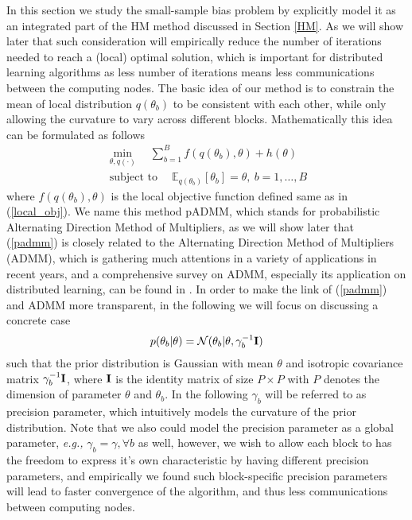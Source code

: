 \documentclass{article}
\DeclareMathOperator*{\st}{subject~to}
\newcommand{\eg}[0]{\emph{e.g., }}
\newcommand{\Imat}[0]{\ensuremath{{\bf I}}\xspace}
\newcommand{\1}[0]{\ensuremath{\boldsymbol{1}}\xspace}
\begin{document}
In this section we study the small-sample bias problem by explicitly model it as an integrated part of the HM method discussed in Section \ref{HM}. As we will show later that such consideration will empirically reduce the number of iterations needed to reach a (local) optimal solution, which is important for distributed learning algorithms as less number of iterations means less communications between the computing nodes. The basic idea of our method is to constrain the mean of local distribution $q(\theta_b)$ to be consistent with each other, while only allowing the curvature to vary across different blocks. Mathematically this idea can be formulated as follows 
\begin{equation}\label{padmm}
\begin{gathered}
\min_{\theta, q(\cdot)} \quad\textstyle\sum_{b=1}^B f(q(\theta_b), \theta) + h(\theta)\\
\st \quad \mathbb{E}_{q(\theta_b)}[\theta_b] = \theta, ~ b = 1, \ldots, B
\end{gathered}
\end{equation}
where $f(q(\theta_b), \theta)$ is the local objective function defined same as in (\ref{local_obj}). We name this method pADMM, which stands for probabilistic Alternating Direction Method of Multipliers, as we will show later that (\ref{padmm}) is closely related to the Alternating Direction Method of Multipliers (ADMM), which is gathering much attentions in a variety of applications in recent years, and a comprehensive survey on ADMM, especially its application on distributed learning, can be found in \cite{Boyd10}. In order to make the link of (\ref{padmm}) and ADMM more transparent, in the following we will focus on discussing a concrete case
\begin{equation}\label{gaussian_prior}
p(\theta_b|\theta) = \mathcal{N}(\theta_b | \theta, \gamma_b^{-1}\Imat)
\end{equation}
such that the prior distribution is Gaussian with mean $\theta$ and isotropic covariance matrix $\gamma_b^{-1}\Imat$, where $\Imat$ is the identity matrix of size $P\times P$ with $P$ denotes the dimension of parameter $\theta$ and $\theta_b$. In the following $\gamma_b$ will be referred to as precision parameter, which intuitively models the curvature of the prior distribution. Note that we also could model the precision parameter as a global parameter, \eg $\gamma_b = \gamma, \forall b$ as well, however, we wish to allow each block to has the freedom to express it's own characteristic by having different precision parameters, and empirically we found such block-specific precision parameters will lead to faster convergence of the algorithm, and thus less communications between computing nodes.
\end{document}
